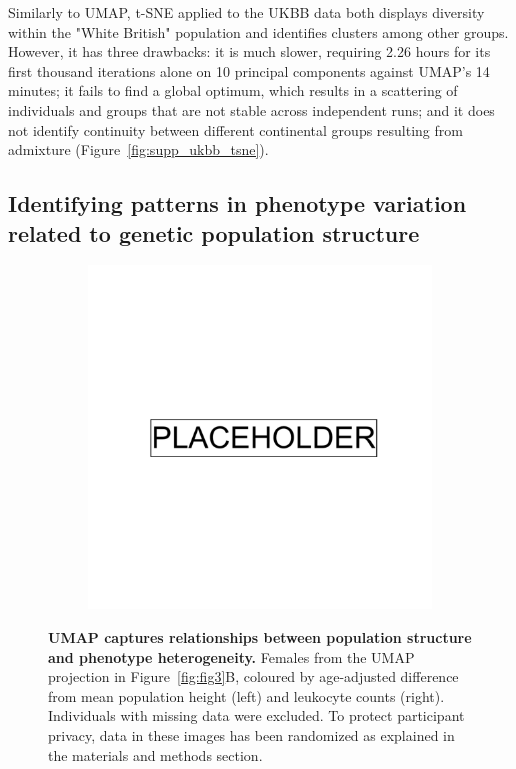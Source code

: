 Similarly to UMAP, t-SNE applied to the UKBB data both displays diversity within the "White British" population and identifies clusters among other groups. However, it has three drawbacks: it is much slower, requiring 2.26 hours for its first thousand iterations alone on 10 principal components against UMAP's 14 minutes; it fails to find a global optimum, which results in a scattering of individuals and groups that are not stable across independent runs; and it does not identify continuity between different continental groups resulting from admixture (Figure~\ref{fig:supp_ukbb_tsne}). 

\subsection{Identifying patterns in phenotype variation related to genetic population structure} 

\begin{figure}
    \centering
    \begin{subfigure}{\columnwidth}
    \includegraphics[width=0.8\columnwidth]{placeholder.png}
    \caption{}
    \label{fig:umap_height_female}
    \end{subfigure}
      \caption[UMAP captures relationships between population structure and phenotype heterogeneity.]{\textbf{UMAP captures relationships between population structure and phenotype heterogeneity.} Females from the UMAP projection in Figure~\ref{fig:fig3}B, coloured by age-adjusted difference from mean population height (left) and leukocyte counts (right). Individuals with missing data were excluded. To protect participant privacy, data in these images has been randomized as explained in the materials and methods section.}
\label{fig:fig6}
\end{figure}

